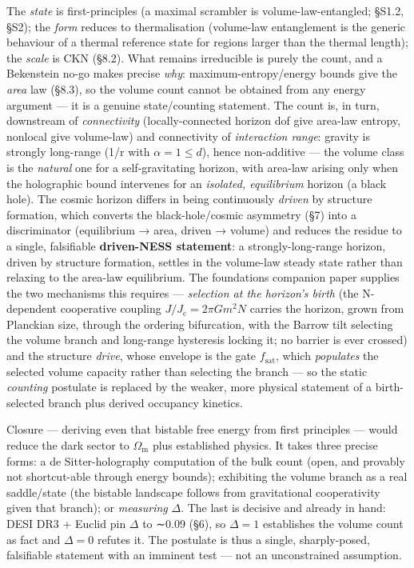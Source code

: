 \documentclass[11pt,a4paper]{article}
\begin{document}
The \emph{state} is first-principles (a maximal scrambler is
volume-law-entangled; §S1.2, §S2); the \emph{form} reduces to
thermalisation (volume-law entanglement is the generic behaviour of a
thermal reference state for regions larger than the thermal length); the
\emph{scale} is CKN (§8.2). What remains irreducible is purely the
count, and a Bekenstein no-go makes precise \emph{why}:
maximum-entropy/energy bounds give the \emph{area} law (§8.3), so the
volume count cannot be obtained from any energy argument --- it is a
genuine state/counting statement. The count is, in turn, downstream of
\emph{connectivity} (locally-connected horizon dof give area-law
entropy, nonlocal give volume-law) and connectivity of \emph{interaction
range}: gravity is strongly long-range (1/r with
\(\alpha  = 1 \leq  d\)), hence non-additive --- the volume class is the
\emph{natural} one for a self-gravitating horizon, with area-law arising
only when the holographic bound intervenes for an \emph{isolated,
equilibrium} horizon (a black hole). The cosmic horizon differs in being
continuously \emph{driven} by structure formation, which converts the
black-hole/cosmic asymmetry (§7) into a discriminator (equilibrium →
area, driven → volume) and reduces the residue to a single, falsifiable
\textbf{driven-NESS statement}: a strongly-long-range horizon, driven by
structure formation, settles in the volume-law steady state rather than
relaxing to the area-law equilibrium. The foundations companion paper
supplies the two mechanisms this requires --- \emph{selection at the
horizon's birth} (the N-dependent cooperative coupling
\(J/J_{\mathrm{c}} = 2\pi Gm^{2}N\) carries the horizon, grown from
Planckian size, through the ordering bifurcation, with the Barrow tilt
selecting the volume branch and long-range hysteresis locking it; no
barrier is ever crossed) and the structure \emph{drive}, whose envelope
is the gate \(f_{\mathrm{sat}}\), which \emph{populates} the selected
volume capacity rather than selecting the branch --- so the static
\emph{counting} postulate is replaced by the weaker, more physical
statement of a birth-selected branch plus derived occupancy kinetics.

Closure --- deriving even that bistable free energy from first
principles --- would reduce the dark sector to \(\Omega _{\mathrm{m}}\)
plus established physics. It takes three precise forms: a de
Sitter-holography computation of the bulk count (open, and provably not
shortcut-able through energy bounds); exhibiting the volume branch as a
real saddle/state (the bistable landscape follows from gravitational
cooperativity given that branch); or \emph{measuring} \(\Delta\). The
last is decisive and already in hand: DESI DR3 + Euclid pin \(\Delta\)
to ∼0.09 (§6), so \(\Delta  = 1\) establishes the volume count as fact
and \(\Delta  = 0\) refutes it. The postulate is thus a single,
sharply-posed, falsifiable statement with an imminent test --- not an
unconstrained assumption.
\end{document}
